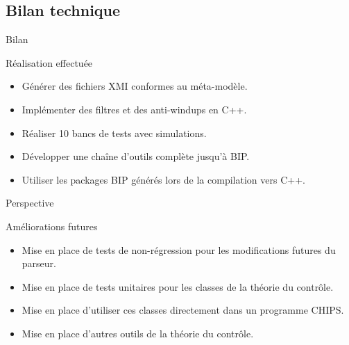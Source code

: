 \subsection{Bilan technique}

\begin{frame}{Bilan}
\begin{block}{Réalisation effectuée}
    
    \begin{itemize}
        \item Générer des fichiers XMI conformes au méta-modèle.
        \item Implémenter des filtres et des anti-windups en C++.
        \item Réaliser 10 bancs de tests avec simulations.
        \item Développer une chaîne d'outils complète jusqu'à BIP.
        \item Utiliser les packages BIP générés lors de la compilation vers C++.
    \end{itemize}
\end{block}
\end{frame}

\begin{frame}{Perspective}
    \begin{block}{Améliorations futures}
    \begin{itemize}
        \item Mise en place de tests de non-régression pour les modifications futures du parseur.
        \item Mise en place de tests unitaires pour les classes de la théorie du contrôle.
        \item Mise en place d'utiliser ces classes directement dans un programme CHIPS.
        \item Mise en place d'autres outils de la théorie du contrôle.
    \end{itemize}
\end{block}
\end{frame}

